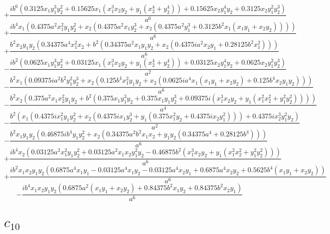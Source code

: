 $$+\frac{i b^{6} \left(0.3125 x_{1} y_{1}^{3} y_{2}^{2} + 0.15625 x_{1} \left(x_{1}^{3} x_{2} y_{2} + y_{1} \left(x_{2}^{4} + y_{2}^{4}\right)\right) + 0.15625 x_{2} y_{1}^{4} y_{2} + 0.3125 x_{2} y_{1}^{2} y_{2}^{3}\right)}{a^{6}}$$
$$+\frac{i b^{4} x_{1} \left(0.4375 a^{2} x_{1}^{2} y_{1} y_{2}^{2} + x_{2} \left(0.4375 a^{2} x_{1} y_{2}^{3} + x_{2} \left(0.4375 a^{2} y_{1}^{3} + 0.3125 b^{2} x_{1} \left(x_{1} y_{1} + x_{2} y_{2}\right)\right)\right)\right)}{a^{6}}$$
$$+\frac{b^{2} x_{2} y_{1} y_{2} \left(0.34375 a^{4} x_{1}^{2} x_{2} + b^{2} \left(0.34375 a^{2} x_{1} y_{1} y_{2} + x_{2} \left(0.4375 i a^{2} x_{2} y_{1} + 0.28125 b^{2} x_{1}^{2}\right)\right)\right)}{a^{6}}$$
$$- \frac{i b^{2} \left(0.0625 x_{1} y_{1}^{3} y_{2}^{2} + 0.03125 x_{1} \left(x_{1}^{3} x_{2} y_{2} + y_{1} \left(x_{2}^{4} + y_{2}^{4}\right)\right) + 0.03125 x_{2} y_{1}^{4} y_{2} + 0.0625 x_{2} y_{1}^{2} y_{2}^{3}\right)}{a^{2}}$$
$$- \frac{b^{2} x_{1} \left(0.09375 i a^{2} b^{2} y_{1}^{2} y_{2}^{3} + x_{2} \left(0.125 b^{4} x_{1}^{2} y_{1} y_{2} + x_{2} \left(0.0625 i a^{4} x_{1} \left(x_{1} y_{1} + x_{2} y_{2}\right) + 0.125 b^{4} x_{2} y_{1} y_{2}\right)\right)\right)}{a^{6}}$$
$$- \frac{b^{2} x_{2} \left(0.375 a^{2} x_{1} x_{2}^{2} y_{1} y_{2} + b^{2} \left(0.375 x_{1} y_{1}^{3} y_{2} + 0.375 x_{1} y_{1} y_{2}^{3} + 0.09375 i \left(x_{1}^{3} x_{2} y_{2} + y_{1} \left(x_{1}^{2} x_{2}^{2} + y_{1}^{2} y_{2}^{2}\right)\right)\right)\right)}{a^{4}}$$
$$- \frac{b^{2} \left(x_{1} \left(0.4375 i x_{1}^{2} y_{1} y_{2}^{2} + x_{2} \left(0.4375 i x_{1} y_{2}^{3} + y_{1} \left(0.375 x_{1}^{2} y_{2} + 0.4375 i x_{2} y_{1}^{2}\right)\right)\right) + 0.4375 i x_{2}^{3} y_{1}^{2} y_{2}\right)}{a^{2}}$$
$$- \frac{b^{2} x_{1} y_{1} y_{2} \left(0.46875 i b^{4} y_{1} y_{2}^{2} + x_{2} \left(0.34375 a^{2} b^{2} x_{1} x_{2} + y_{1} y_{2} \left(0.34375 a^{4} + 0.28125 b^{4}\right)\right)\right)}{a^{6}}$$
$$+\frac{i b^{4} x_{2} \left(0.03125 a^{2} x_{1}^{2} y_{1} y_{2}^{2} + 0.03125 a^{2} x_{1} x_{2} y_{1}^{2} y_{2} - 0.46875 b^{2} \left(x_{1}^{3} x_{2} y_{2} + y_{1} \left(x_{1}^{2} x_{2}^{2} + y_{1}^{2} y_{2}^{2}\right)\right)\right)}{a^{6}}$$
$$+\frac{i b^{2} x_{1} x_{2} y_{1} y_{2} \left(0.6875 a^{4} x_{1} y_{1} - 0.03125 a^{4} x_{1} y_{2} - 0.03125 a^{4} x_{2} y_{1} + 0.6875 a^{4} x_{2} y_{2} + 0.5625 b^{4} \left(x_{1} y_{1} + x_{2} y_{2}\right)\right)}{a^{6}}$$
$$- \frac{i b^{4} x_{1} x_{2} y_{1} y_{2} \left(0.6875 a^{2} \left(x_{1} y_{1} + x_{2} y_{2}\right) + 0.84375 b^{2} x_{1} y_{2} + 0.84375 b^{2} x_{2} y_{1}\right)}{a^{6}}$$

\section{$c_{10}$}

